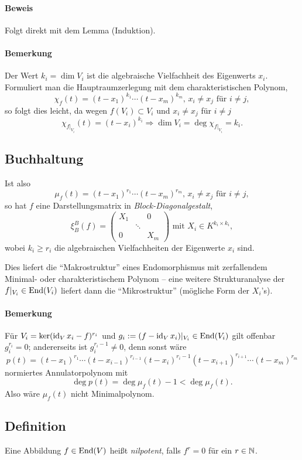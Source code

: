 \paragraph{Beweis}
	Folgt direkt mit dem Lemma (Induktion).

\paragraph{Bemerkung}
	Der Wert $ k_i = \dim V_i $ ist die algebraische Vielfachheit des Eigenwerts $ x_i $. Formuliert man die Hauptraumzerlegung mit dem charakteristischen Polynom,
		\[ \chi_f(t) = (t-x_1)^{k_1}\cdots (t-x_m)^{k_m},\, x_i \neq x_j \text{ für } i\neq j, \]
	so folgt dies leicht, da wegen $ f(V_i)\subset V_i $ und $ x_i\neq x_j $ für $ i\neq j $
		\[ \chi_{f|_{V_i}}(t) = (t-x_i)^{k_i}\Rightarrow \dim V_i = \deg \chi_{f|_{V_i}} = k_i. \]
\subsection{Buchhaltung}
	Ist also
		\[ \mu_f(t) = (t-x_1)^{r_1}\cdots (t-x_m)^{r_m},\, x_i\neq x_j \text{ für }i\neq j, \]
	so hat $ f $ eine Darstellungsmatrix in \emph{Block-Diagonalgestalt},
		\[ \xi_B^B(f) = \begin{pmatrix}
		X_1 & & 0 \\
		& \ddots & \\
		0 & & X_m
		\end{pmatrix} \text{ mit }X_i \in K^{k_i\times k_i}, \]
	wobei $ k_i\geq r_i $ die algebraischen Vielfachheiten der Eigenwerte $ x_i $ sind.
	
	Dies liefert die "`Makrostruktur"' eines Endomorphismus mit zerfallendem Minimal- oder charakteristischem Polynom -- eine weitere Strukturanalyse der $ f|_{V_i} \in \operatorname{End}(V_i) $ liefert dann die "`Mikrostruktur"' (mögliche Form der $ X_i $'s).
\paragraph{Bemerkung}
	Für $ V_i = \ker (\operatorname{id}_Vx_i-f)^{r_i} $ und $ g_i := (f-\operatorname{id}_Vx_i)|_{V_i} \in \operatorname{End}(V_i) $ gilt offenbar $ g_i^{r_i} = 0 $; andererseits ist $ g_i^{r_i-1}\neq 0 $, denn sonst wäre
		\[ p(t) = (t-x_1)^{r_1}\cdots (t-x_{i-1})^{r_{i-1}}(t-x_i)^{r_i-1}(t-x_{i+1})^{r_{i+1}}\cdots (t-x_m)^{r_m} \]
	normiertes Annulatorpolynom mit
		\[ \deg p(t) = \deg \mu_f(t)-1 < \deg \mu_f(t). \]
	Also wäre $ \mu_f(t) $ nicht Minimalpolynom.

\subsection{Definition}
\begin{Definition}[nilpotent]
	Eine Abbildung $ f\in \operatorname{End}(V) $ heißt \emph{nilpotent}, falls $ f^r=0 $ für ein $ r\in \mathbb{N} $.
\end{Definition}
